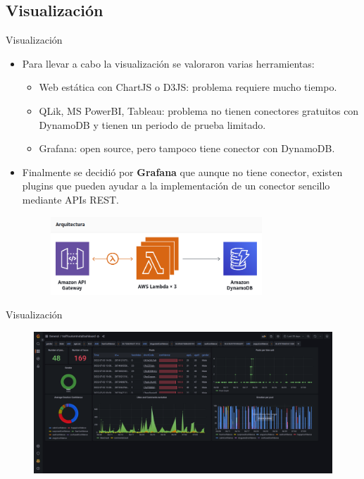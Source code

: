 \documentclass[aspectratio=149]{beamer}
\begin{document}
\subsection{Visualización}
\begin{frame}[label=visualizacion1]{Visualización}
    \begin{itemize}
        \item Para llevar a cabo la visualización se valoraron varias herramientas:
        \begin{itemize}
            \item Web estática con ChartJS o D3JS: problema requiere mucho tiempo.
            \item QLik, MS PowerBI, Tableau: problema no tienen conectores gratuitos con DynamoDB y tienen un periodo de prueba limitado.
            \item Grafana: open source, pero tampoco tiene conector con DynamoDB.
        \end{itemize}
        \item Finalmente se decidió por \textbf{Grafana} que aunque no tiene conector, existen plugins que pueden ayudar a la implementación de un conector sencillo mediante APIs REST.
        \begin{figure}
            \centering
            \includegraphics[width=0.75\textwidth]{img/gateway_flow.png}
            \label{fig:gate_flow}
        \end{figure}
    \end{itemize}
\end{frame}
\begin{frame}[label=visualizacion2]{Visualización}
    \begin{figure}
        \centering
        \includegraphics[width=1.0\textwidth]{img/dashboard.png}
        \label{fig:grafana}
    \end{figure}
\end{frame}
\end{document}
